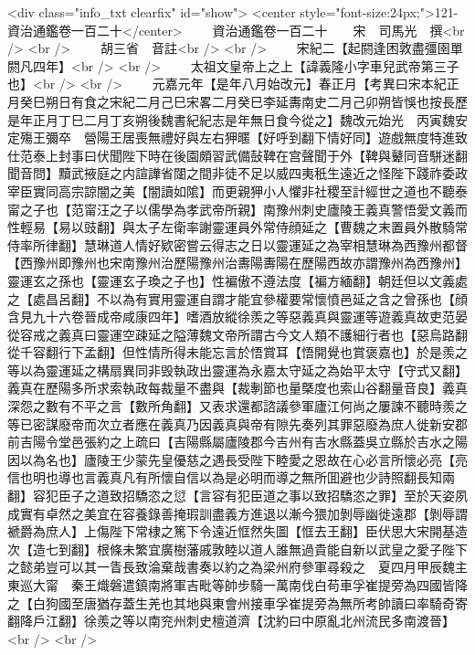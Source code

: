<div class="info_txt clearfix" id="show">
<center style="font-size:24px;">121-資治通鑑卷一百二十</center>
  　　資治通鑑卷一百二十　　宋　司馬光　撰<br />
<br />
　　胡三省　音註<br />
<br />
　　宋紀二【起閼逢困敦盡彊圉單閼凡四年】<br />
<br />
　　太祖文皇帝上之上【諱義隆小字車兒武帝第三子也】<br />
<br />
　　元嘉元年【是年八月始改元】春正月【考異曰宋本紀正月癸巳朔日有食之宋紀二月己巳宋畧二月癸巳李延夀南史二月己卯朔皆悞也按長歷是年正月丁巳二月丁亥朔後魏書紀紀志是年無日食今從之】魏改元始光　丙寅魏安定殤王彌卒　營陽王居喪無禮好與左右狎暱【好呼到翻下情好同】遊戲無度特進致仕范泰上封事曰伏聞陛下時在後園頗習武備鼔鞞在宫聲聞于外【鞞與鼙同音駢迷翻聞音問】黷武掖庭之内諠譁省闥之間非徒不足以威四夷秖生遠近之怪陛下踐祚委政宰臣實同高宗諒闇之美【闇讀如隂】而更親狎小人懼非社稷至計經世之道也不聽泰甯之子也【范甯汪之子以儒學為孝武帝所親】南豫州刺史廬陵王義真警悟愛文義而性輕易【易以豉翻】與太子左衛率謝靈運員外常侍顔延之【曹魏之末置員外散騎常侍率所律翻】慧琳道人情好欵密嘗云得志之日以靈運延之為宰相慧琳為西豫州都督【西豫州即豫州也宋南豫州治歷陽豫州治夀陽夀陽在歷陽西故亦謂豫州為西豫州】靈運玄之孫也【靈運玄子瑍之子也】性褊傲不遵法度【褊方緬翻】朝廷但以文義處之【處昌呂翻】不以為有實用靈運自謂才能宜參權要常懷憤邑延之含之曾孫也【顔含見九十六卷晉成帝咸康四年】嗜酒放縱徐羨之等惡義真與靈運等遊義真故吏范晏從容戒之義真曰靈運空疎延之隘薄魏文帝所謂古今文人類不護細行者也【惡烏路翻從千容翻行下孟翻】但性情所得未能忘言於悟賞耳【悟開覺也賞褒嘉也】於是羨之等以為靈運延之構扇異同非毁執政出靈運為永嘉太守延之為始平太守【守式又翻】義真在歷陽多所求索執政每裁量不盡與【裁剸節也量槩度也索山谷翻量音良】義真深怨之數有不平之言【數所角翻】又表求還都諮議參軍廬江何尚之屢諫不聽時羨之等已密謀廢帝而次立者應在義真乃因義真與帝有隙先奏列其罪惡廢為庶人徙新安郡前吉陽令堂邑張約之上疏曰【吉陽縣屬廬陵郡今吉州有吉水縣蓋吳立縣於吉水之陽因以為名也】廬陵王少蒙先皇優慈之遇長受陛下睦愛之恩故在心必言所懷必亮【亮信也明也導也言義真凡有所懷自信以為是必明而導之無所囬避也少詩照翻長知兩翻】容犯臣子之道致招驕恣之愆【言容有犯臣道之事以致招驕恣之罪】至於天姿夙成實有卓然之美宜在容養錄善掩瑕訓盡義方進退以漸今猥加剝辱幽徙遠郡【剝辱謂褫爵為庶人】上傷陛下常棣之篤下令遠近恇然失圖【恇去王翻】臣伏思大宋開基造次【造七到翻】根條未繁宜廣樹藩戚敦睦以道人誰無過貴能自新以武皇之愛子陛下之懿弟豈可以其一眚長致淪棄哉書奏以約之為梁州府參軍尋殺之　夏四月甲辰魏主東巡大甯　秦王熾磐遣鎮南將軍吉毗等帥步騎一萬南伐白苟車孚崔提旁為四國皆降之【白狗國至唐猶存蓋生羌也其地與東會州接車孚崔提旁為無所考帥讀曰率騎奇寄翻降戶江翻】徐羨之等以南兖州刺史檀道濟【沈約曰中原亂北州流民多南渡晉】<br />
<br />
